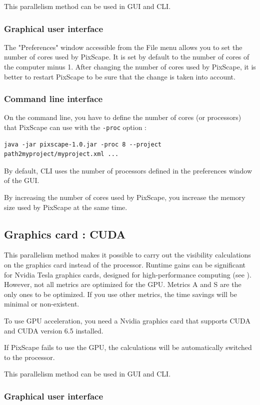 \documentclass{report}
\begin{document}
This parallelism method can be used in GUI and CLI.

\subsubsection{Graphical user interface}
The "Preferences" window accessible from the File menu allows you to set the number of cores used by PixScape. It is set by default to the number of cores of the computer minus 1. After changing the number of cores used by PixScape, it is better to restart PixScape to be sure that the change is taken into account.

\subsubsection{Command line interface}
On the command line, you have to define the number of cores (or processors) that PixScape can use with the \verb|-proc| option :
\begin{Verbatim}
java -jar pixscape-1.0.jar -proc 8 --project path2myproject/myproject.xml ...
\end{Verbatim}
By default, CLI uses the number of processors defined in the preferences window of the GUI.

By increasing the number of cores used by PixScape, you increase the memory size used by PixScape at the same time.


\subsection{Graphics card : CUDA}
\label{cuda}
This parallelism method makes it possible to carry out the visibility calculations on the graphics card instead of the processor. Runtime gains can be significant for Nvidia Tesla graphics cards, designed for high-performance computing (see ). However, not all metrics are optimized for the GPU. Metrics A and S are the only ones to be optimized. If you use other metrics, the time savings will be minimal or non-existent.

To use GPU acceleration, you need a Nvidia graphics card that supports CUDA and CUDA version 6.5 installed. 

If PixScape fails to use the GPU, the calculations will be automatically switched to the processor.

This parallelism method can be used in GUI and CLI.

\subsubsection{Graphical user interface}
\end{document}
